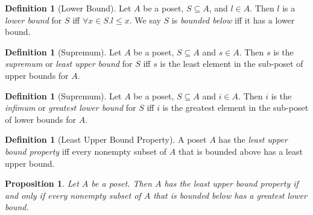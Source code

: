 \documentclass{book}
\newtheorem{prop}[ax]{Proposition}
\theoremstyle{definition}
\newtheorem{df}[ax]{Definition}
\begin{document}
\begin{df}[Lower Bound]
Let $A$ be a poset, $S \subseteq A$, and $l \in A$. Then $l$ is a \emph{lower bound} for $S$ iff $\forall x \in S. l \leq x$. We say $S$ is \emph{bounded below} iff it has a lower bound.
\end{df}

\begin{df}[Supremum]
Let $A$ be a poset, $S \subseteq A$ and $s \in A$. Then $s$ is the \emph{supremum} or \emph{least upper bound} for $S$ iff $s$ is the least element in the sub-poset of upper bounds for $A$.
\end{df}

\begin{df}[Supremum]
Let $A$ be a poset, $S \subseteq A$ and $i \in A$. Then $i$ is the \emph{infimum} or \emph{greatest lower bound} for $S$ iff $i$ is the greatest element in the sub-poset of lower bounds for $A$.
\end{df}

\begin{df}[Least Upper Bound Property]
A poset $A$ has the \emph{least upper bound property} iff every nonempty subset of $A$ that is bounded above has a least upper bound.
\end{df}

\begin{prop}
Let $A$ be a poset. Then $A$ has the least upper bound property if and only if every nonempty subset of $A$ that is bounded below has a greatest lower bound.
\end{prop}
\end{document}

